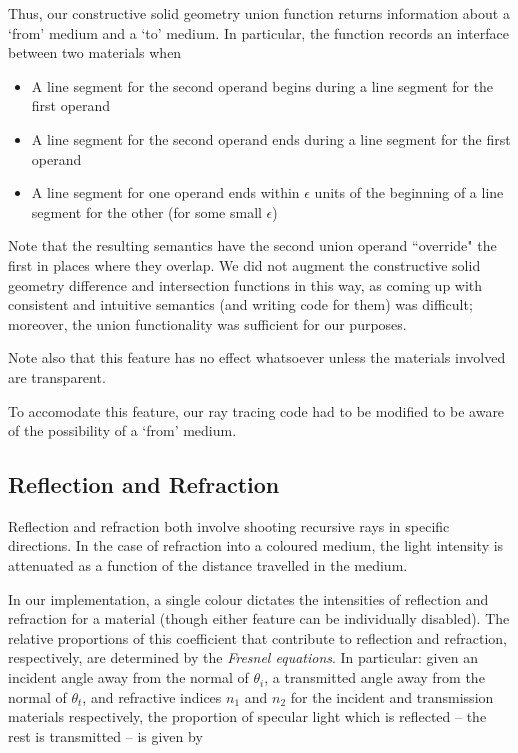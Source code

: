 \documentclass{article}
\begin{document}
Thus, our constructive solid geometry union function returns information about a
`from' medium and a `to' medium. In particular, the function records an
interface between two materials when

\begin{itemize}
  \item A line segment for the second operand begins during a line segment for
    the first operand
  \item A line segment for the second operand ends during a line segment for the
    first operand
  \item A line segment for one operand ends within $\epsilon$ units of the
    beginning of a line segment for the other (for some small $\epsilon$)
\end{itemize}

Note that the resulting semantics have the second union operand ``override" the
first in places where they overlap. We did not augment the constructive solid
geometry difference and intersection functions in this way, as coming up with
consistent and intuitive semantics (and writing code for them) was
difficult; moreover, the union functionality was sufficient for our purposes.

Note also that this feature has no effect whatsoever unless the materials
involved are transparent.

To accomodate this feature, our ray tracing code had to be modified to be aware
of the possibility of a `from' medium.

\subsection{Reflection and Refraction}

Reflection and refraction both involve shooting recursive rays in
specific directions. In the case of refraction into a coloured medium, the
light intensity is attenuated as a function of the distance travelled in the
medium.

In our implementation, a single colour dictates the intensities of reflection and
refraction for a material (though either feature can be individually disabled).
The relative proportions of this coefficient that contribute to reflection and
refraction, respectively, are determined by the \emph{Fresnel equations}. In
particular: given an incident angle away from the normal of $\theta_i$,
a transmitted angle away from the normal of $\theta_t$, and refractive indices
$n_1$ and $n_2$ for the incident and transmission materials respectively, the
proportion of specular light which is reflected -- the rest is transmitted -- is
given by
\end{document}
